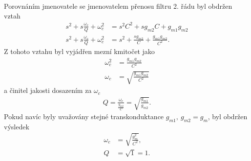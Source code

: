 Porovnáním jmenovatele se jmenovatelem přenosu filtru 2. řádu byl obdržen vztah
\begin{align}
s^2 + s\frac{\omega _c}{Q} + \omega _c^2 &= s^2C^2 + sg_{m2}C + g_{m1}g_{m2}\\
s^2 + s\frac{\omega _c}{Q} + \omega _c^2 &= s^2 + \frac{sg_{m2}}{C} + \frac{g_{m1}g_{m2}}{C^2}.
\end{align}
Z tohoto vztahu byl vyjádřen mezní kmitočet jako 
\begin{align}
\omega _c^2 &= \frac{g_{m1}g_{m2}}{C^2} \\
\omega _c &= \sqrt{\frac{g_{m1}g_{m2}}{C^2}}
\end{align}
a činitel jakosti dosazením za $\omega _c$
\begin{align}
Q = \frac{\omega _c}{\frac{g_{m2}}{C}} = \sqrt{\frac{g_{m1}}{g_{m2}}}.
\end{align}
Pokud navíc byly uvažovány stejné transkonduktance $g_{m1}, \ g_{m2} = g_m$, byl obdržen výsledek
\begin{align}
\omega _c &= \sqrt{\frac{g_m^2}{C^2}},\\
Q &= \sqrt{1} = 1.
\end{align}